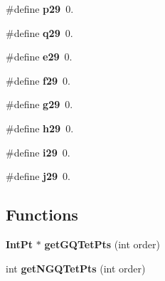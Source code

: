 \begin{DoxyCompactItemize}
\item 
\#define {\bfseries p29}~0.\label{GaussQuadratureTet_8cc_ab9b6e55e88ea7b83be46b7d7022a2984}

\item 
\#define {\bfseries q29}~0.\label{GaussQuadratureTet_8cc_a1d89626ed04c2a9051f621e9fd244205}

\item 
\#define {\bfseries e29}~0.\label{GaussQuadratureTet_8cc_a9569bfd8330306ea649a43e20d036c0c}

\item 
\#define {\bfseries f29}~0.\label{GaussQuadratureTet_8cc_ab4683d874faaf9b36360c859d117a129}

\item 
\#define {\bfseries g29}~0.\label{GaussQuadratureTet_8cc_a6eaba55e87732ed4163ad164ac442524}

\item 
\#define {\bfseries h29}~0.\label{GaussQuadratureTet_8cc_a10d00bce57e3679db86e3259212edb3b}

\item 
\#define {\bfseries i29}~0.\label{GaussQuadratureTet_8cc_a02f4ff9f6724e6db2abd02ba45f302b2}

\item 
\#define {\bfseries j29}~0.\label{GaussQuadratureTet_8cc_a4d7a6e1f24bf705a6f63ee2e7c9b2d03}

\end{DoxyCompactItemize}
\subsection*{Functions}
\begin{DoxyCompactItemize}
\item 
{\bf Int\-Pt} $\ast$ {\bfseries get\-G\-Q\-Tet\-Pts} (int order)\label{GaussQuadratureTet_8cc_aa2fbc54e6316bf5423477d2b50cbe997}

\item 
int {\bfseries get\-N\-G\-Q\-Tet\-Pts} (int order)\label{GaussQuadratureTet_8cc_a1282cd52b52f5b92299c1f8afd99f7e9}

\end{DoxyCompactItemize}

